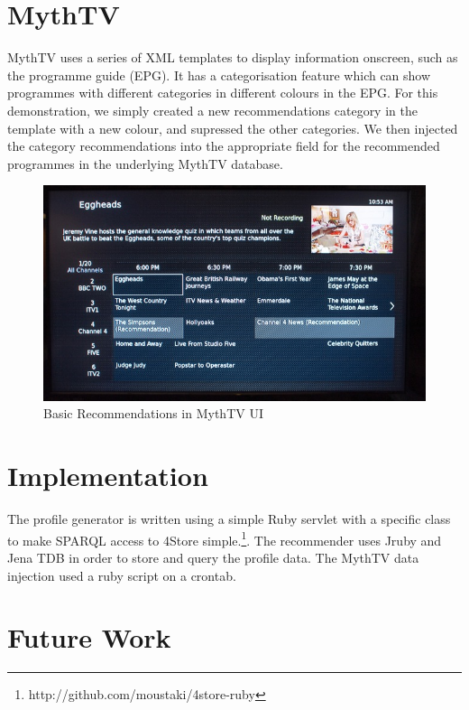\documentclass[]{article}
\begin{document}
\section{MythTV}

MythTV uses a series of XML templates to display information onscreen, such as the programme guide (EPG). It has a categorisation feature which can show programmes with different categories in different colours in the EPG. For this demonstration, we simply created a new recommendations category in the template with a new colour, and supressed the other categories. We then injected the category recommendations into the appropriate field for the recommended programmes in the underlying MythTV database.

\begin{figure}[h] 
\begin{center}
\includegraphics[width=12 cm]{mythtv-recommendations.jpg}
\caption{Basic Recommendations in MythTV UI}
\label{mythrecs}
\end{center}
\end{figure}

\section{Implementation}

The profile generator is written using a simple Ruby servlet with a specific class to make SPARQL access to 4Store simple.\footnote{http://github.com/moustaki/4store-ruby}. The recommender uses Jruby and Jena TDB in order to store and query the profile data. The MythTV data injection used a ruby script on a crontab.

\section{Future Work}
\end{document}
